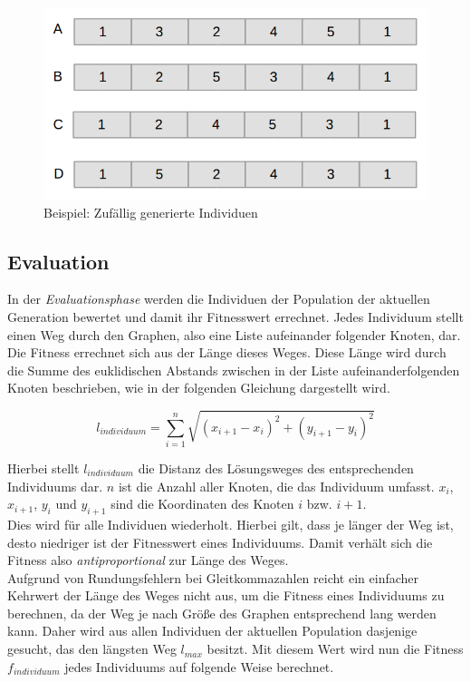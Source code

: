 \documentclass[12pt,a4paper]{scrreprt}
\begin{document}
\begin{figure}[ht]
  	\centering
	\includegraphics[width=400pt]{images/algo_02_init.png}
	\caption{Beispiel: Zufällig generierte Individuen}
	\label{fig:algo-sample-individuals}
\end{figure}

\subsection{Evaluation}
\label{subsec:evaluation}

In der \textit{Evaluationsphase} werden die Individuen der Population der aktuellen Generation bewertet und damit ihr Fitnesswert errechnet. Jedes Individuum stellt einen Weg durch den Graphen, also eine Liste aufeinander folgender Knoten, dar. Die Fitness errechnet sich aus der Länge dieses Weges. Diese Länge wird durch die Summe des euklidischen Abstands zwischen in der Liste aufeinanderfolgenden Knoten beschrieben, wie in der folgenden Gleichung dargestellt wird.

$$
l_{individuum} = \sum_{i=1}^{n} \sqrt{(x_{i+1} - x_i)^2 + (y_{i+1} - y_i)^2}
$$

Hierbei stellt $l_{individuum}$ die Distanz des Lösungsweges des entsprechenden Individuums dar. $n$ ist die Anzahl aller Knoten, die das Individuum umfasst. $x_i$, $x_{i+1}$, $y_i$ und $y_{i+1}$ sind die Koordinaten des Knoten $i$ bzw. $i+1$.\\
Dies wird für alle Individuen wiederholt. Hierbei gilt, dass je länger der Weg ist, desto niedriger ist der Fitnesswert eines Individuums. Damit verhält sich die Fitness also \textit{antiproportional} zur Länge des Weges.\\
Aufgrund von Rundungsfehlern bei Gleitkommazahlen reicht ein einfacher Kehrwert der Länge des Weges nicht aus, um die Fitness eines Individuums zu berechnen, da der Weg je nach Größe des Graphen entsprechend lang werden kann. Daher wird aus allen Individuen der aktuellen Population dasjenige gesucht, das den längsten Weg $l_{max}$ besitzt. Mit diesem Wert wird nun die Fitness $f_{individuum}$ jedes Individuums auf folgende Weise berechnet.
\end{document}
